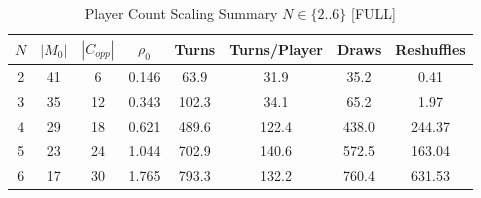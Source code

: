 \begin{table}[ht]
\centering
\caption{Player Count Scaling Summary $N \in \{2..6\}$ [FULL]}
\begin{tabular}{cccccccc}
\hline
$N$ & $|M_0|$ & $|C_{opp}|$ & $\rho_0$ & Turns & Turns/Player & Draws & Reshuffles \\
\hline
2 & 41 & 6 & 0.146 & 63.9 & 31.9 & 35.2 & 0.41 \\
3 & 35 & 12 & 0.343 & 102.3 & 34.1 & 65.2 & 1.97 \\
4 & 29 & 18 & 0.621 & 489.6 & 122.4 & 438.0 & 244.37 \\
5 & 23 & 24 & 1.044 & 702.9 & 140.6 & 572.5 & 163.04 \\
6 & 17 & 30 & 1.765 & 793.3 & 132.2 & 760.4 & 631.53 \\
\hline
\end{tabular}
\end{table}
